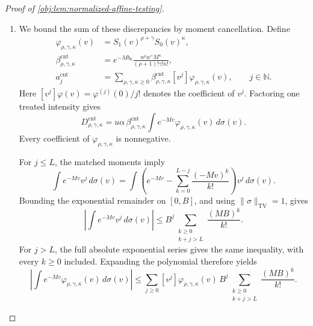 \documentclass[11pt]{article}
\begin{document}
\begin{proof}[Proof of \cref{obj:lem:normalized-affine-testing}]
\begin{enumerate}
\item
We bound the sum of these discrepancies by moment cancellation. Define
\[
\begin{aligned}
\varphi_{\rho,\gamma,\kappa}(v)
&=S_1(v)^{\rho+\gamma}S_0(v)^\kappa,\\
\beta_{\rho,\gamma,\kappa}^{\mathrm{cnt}}
&=e^{-Mb_0}
  \frac{u^\rho w^\gamma M^\kappa}{(\rho+1)!\gamma!\kappa!},\\
a_j^{\mathrm{cnt}}
&=\sum_{\rho,\gamma,\kappa\ge0}
  \beta_{\rho,\gamma,\kappa}^{\mathrm{cnt}}
  [v^j]\varphi_{\rho,\gamma,\kappa}(v),
\qquad j\in\mathbb N.
\end{aligned}
\]
Here \([v^j]\varphi(v)=\varphi^{(j)}(0)/j!\) denotes the coefficient of \(v^j\). Factoring one treated intensity gives
\[
D_{\rho,\gamma,\kappa}^{\mathrm{cnt}}
=u\alpha\,\beta_{\rho,\gamma,\kappa}^{\mathrm{cnt}}
\int e^{-Mv}\varphi_{\rho,\gamma,\kappa}(v)\,d\sigma(v).
\]
Every coefficient of \(\varphi_{\rho,\gamma,\kappa}\) is nonnegative.

For \(j\le L\), the matched moments imply
\[
\int e^{-Mv}v^j\,d\sigma(v)
=
\int\left(e^{-Mv}
-\sum_{k=0}^{L-j}\frac{(-Mv)^k}{k!}\right)v^j\,d\sigma(v).
\]
Bounding the exponential remainder on \([0,B]\), and using
\(\|\sigma\|_{\mathrm{TV}}=1\), gives
\[
\left|\int e^{-Mv}v^j\,d\sigma(v)\right|
\le B^j\sum_{\substack{k\ge0\\k+j>L}}\frac{(MB)^k}{k!}.
\]
For \(j>L\), the full absolute exponential series gives the same inequality, with every \(k\ge0\) included. Expanding the polynomial therefore yields
\[
\left|\int e^{-Mv}\varphi_{\rho,\gamma,\kappa}(v)\,d\sigma(v)\right|
\le
\sum_{j\ge0}[v^j]\varphi_{\rho,\gamma,\kappa}(v)\,
B^j\sum_{\substack{k\ge0\\k+j>L}}\frac{(MB)^k}{k!}.
\]


\end{enumerate}
\end{proof}
\end{document}
